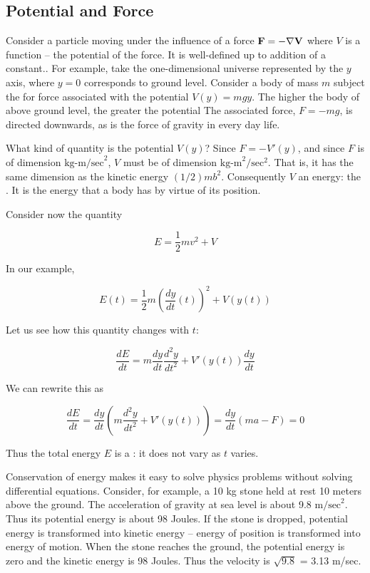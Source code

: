 \subsection{Potential and Force}

Consider a particle moving under the influence of a force $\bf{F} = - \nabla V$ where  $V$ is a function -- the potential of the force.  It is well-defined up to addition of a constant..  For example, take the one-dimensional universe  represented by the $y$ axis, where $y = 0$ corresponds to ground level.  Consider a body of mass $m$ subject the for force associated with the potential $V(y) = mgy$.  The higher the body of above ground level, the greater the potential  The associated force, $F = -mg$, is directed downwards, as is the force of gravity in every day life.

What kind of quantity is the potential $V(y)$?  Since $F = -V'(y)$, and since $F$ is of dimension $\text{kg-m/sec}^2$, $V$ must be of dimension $\text{kg-m}^2/\text{sec}^2$.  That is, it has the same dimension as the kinetic energy $(1/2)mb^2$.  Consequently $V$
 an energy: the .
It is the energy that a body has by virtue of its position.

Consider now the quantity

\begin{equation}
  E = \frac{1}{2}mv^2 + V
\end{equation}

In our example,

\begin{equation}
  E(t) = \frac{1}{2}m\left(\frac{dy}{dt}(t)\right)^2 + V(y(t))
\end{equation}

Let us see how this quantity changes with $t$:

\begin{equation}
  \frac{dE}{dt} = m\frac{dy}{dt}\frac{ d^2y }{ dt^2 }+ V'(y(t))\frac{dy}{dt}
\end{equation}

We can rewrite this as

\begin{equation}
  \frac{dE}{dt}
   = \frac{dy}{dt}\left(m\frac{ d^2y }{ dt^2 }+ V'(y(t))\right)
    = \frac{dy}{dt}\left(ma - F\right)  = 0
\end{equation}

Thus the total energy $E$ is a : it does not vary
as $t$ varies.

Conservation of energy makes it easy to solve physics problems without solving differential equations.  Consider, for example, a 10 kg stone held at rest 10 meters above the ground.  The acceleration of gravity at sea level is about 9.8 $\text{m/sec}^2$.  Thus its potential energy is about 98 Joules.  If the stone is dropped, potential energy is transformed into kinetic energy -- energy of position is transformed into energy of motion. When the stone reaches the ground, the potential energy is zero and the kinetic energy is 98 Joules.  Thus the velocity is $\sqrt{9.8}$ = 3.13 m/sec.

